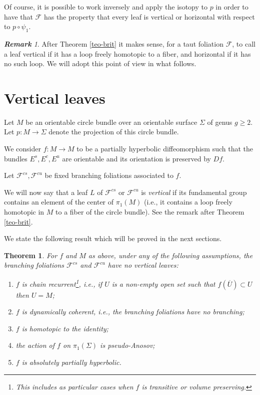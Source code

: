 \documentclass[11pt]{amsart} %
\newcommand{\Es}{E^s}
\newcommand{\Ec}{E^c}
\newcommand{\Eu}{E^u}
\newcommand{\cF}{\mathcal{F}}
\newcommand{\Fcu}{\mathcal{F}^{cu}}
\newcommand{\Fcs}{\mathcal{F}^{cs}}
\numberwithin{equation}{section}
\newtheorem{thm}[equation]{Theorem}
\theoremstyle{remark}
\newtheorem*{remark} {\textbf{Remark}}
\begin{document}
Of course, it is possible to work inversely and apply the isotopy to $p$ in order to have that $\cF$ has the property that every leaf is vertical or horizontal with respect to $p\circ \psi_1$. 

\begin{remark}
After Theorem \ref{teo-brit} it makes sense, for a taut foliation $\cF$, to call a leaf vertical if it has a loop freely homotopic to a fiber, and horizontal if it has no such loop. We will adopt this point of view in what follows. 
\end{remark}

%

\section{Vertical leaves}\label{s.novert}

Let $M$ be an orientable circle bundle over an orientable surface $\Sigma$ of genus $g\geq 2$. Let $p: M \to \Sigma$ denote the projection of this circle bundle. 

We consider $f: M \to M$ to be a partially hyperbolic diffeomorphism such that the bundles $\Es,\Ec,\Eu$ are orientable and its orientation is preserved by $Df$. 

Let $\Fcs,\Fcu$ be fixed branching foliations associated to $f$. 

We will now say that a leaf $L$ of $\Fcs$ or $\Fcu$ is \emph{vertical} if its fundamental group contains an element of the center of $\pi_1(M)$ (i.e., it contains a loop freely homotopic in $M$ to a fiber of the circle bundle). See the remark after Theorem \ref{teo-brit}. 

We state the following result which will be proved in the next sections. 

\begin{thm}\label{teo-novert} 
For $f$ and $M$ as above, under any of the following assumptions, the branching foliations $\Fcs$ and $\Fcu$ have no vertical leaves:
\begin{enumerate}
\item \label{it-transitivity} $f$ is \emph{chain recurrent}\footnote{This includes as particular cases when $f$ is transitive or volume preserving.}, i.e., if $U$ is a non-empty open set such that $f(\overline U)\subset U$ then $U=M$;
\item \label{it-coherence} $f$ is \emph{dynamically coherent}, i.e., the branching foliations have no branching;
\item \label{it-isotopicid} $f$ is \emph{homotopic to the identity};
\item \label{it-isotopicpA} the action of $f$ on $\pi_1(\Sigma)$ is \emph{pseudo-Anosov};
\item \label{it-absolute} $f$ is \emph{absolutely partially hyperbolic}.  
\end{enumerate}
\end{thm}
\end{document}
